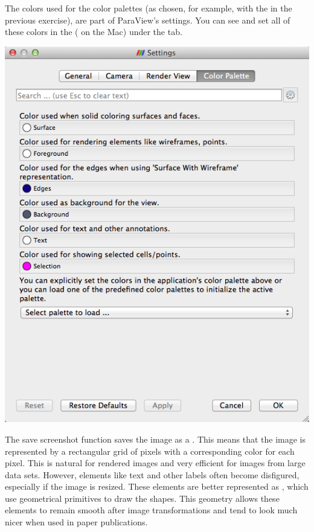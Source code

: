 The colors used for the color palettes (as chosen, for example, with the
 in the previous exercise), are part of
ParaView's settings.  You can see and set all of these colors in the
 \ra {} ( \ra {} on the
Mac) under the  tab. 
\begin{inlinefig}
  \includegraphics[width=\scw]{images/SettingsColors}
\end{inlinefig}


The save screenshot function saves the image as a .
This means that the image is represented by a rectangular grid of pixels
with a corresponding color for each pixel. This is natural for rendered
images and very efficient for images from large data sets. However,
elements like text and other labels often become disfigured, especially if
the image is resized. These elements are better represented as
, which use geometrical primitives to draw the
shapes. This geometry allows these elements to remain smooth after image
transformations and tend to look much nicer when used in paper
publications.

